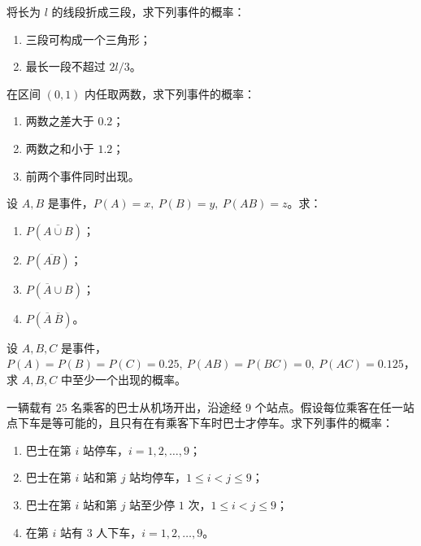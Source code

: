 \begin{homework}[1.13]
将长为 $l$ 的线段折成三段，求下列事件的概率：

\begin{enumerate}
  \item 三段可构成一个三角形；
  \item 最长一段不超过 $2l/3$。
\end{enumerate}
\end{homework}

\begin{homework}[1.14]
在区间 $(0,1)$ 内任取两数，求下列事件的概率：

\begin{enumerate}
  \item 两数之差大于 $0.2$；
  \item 两数之和小于 $1.2$；
  \item 前两个事件同时出现。
\end{enumerate}
\end{homework}

\begin{homework}[1.15]
设 $A,B$ 是事件，$P(A)=x,\ P(B)=y,\ P(AB)=z$。求：

\begin{enumerate}
  \item $P(\overline{A \cup B})$；
  \item $P(\overline{AB})$；
  \item $P(\overline{A} \cup B)$；
  \item $P(\overline{A}\ \overline{B})$。
\end{enumerate}
\end{homework}

\begin{homework}[1.16]
设 $A,B,C$ 是事件，$P(A)=P(B)=P(C)=0.25,\ P(AB)=P(BC)=0,\ P(AC)=0.125$，求 $A,B,C$ 中至少一个出现的概率。
\end{homework}

\begin{homework}[1.17]
一辆载有 $25$ 名乘客的巴士从机场开出，沿途经 $9$ 个站点。假设每位乘客在任一站点下车是等可能的，且只有在有乘客下车时巴士才停车。求下列事件的概率：

\begin{enumerate}
  \item 巴士在第 $i$ 站停车，$i=1,2,\dots,9$；
  \item 巴士在第 $i$ 站和第 $j$ 站均停车，$1 \le i < j \le 9$；
  \item 巴士在第 $i$ 站和第 $j$ 站至少停 $1$ 次，$1 \le i < j \le 9$；
  \item 在第 $i$ 站有 $3$ 人下车，$i=1,2,\dots,9$。
\end{enumerate}
\end{homework}
